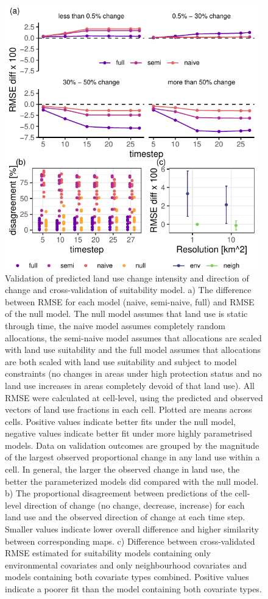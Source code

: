 \documentclass[titlesmallcaps,copyrightpage]{uomthesis}\usepackage[]{graphicx}\usepackage[]{color}
\begin{document}
\begin{figure}[htb]
\centering
\includegraphics[width=4.33in]{chapters/figures/chapter3/fig3.pdf} 
\caption{Validation of predicted land use change intensity and direction of change and cross-validation of suitability model. a) The difference between RMSE for each model (naive, semi-naive, full) and RMSE of the null model. The null model assumes that land use is static through time, the naive model assumes completely random allocations, the semi-naive model assumes that allocations are scaled with land use suitability and the full model assumes that allocations are both scaled with land use suitability and subject to model constraints (no changes in areas under high protection status and no land use increases in areas completely devoid of that land use). All RMSE were calculated at cell-level, using the predicted and observed vectors of land use fractions in each cell. Plotted are means across cells. Positive values indicate better fits under the null model, negative values indicate better fit under more highly parametrised models. Data on validation outcomes are grouped by the magnitude of the largest observed proportional change in any land use within a cell. In general, the larger the observed change in land use, the better the parameterized models did compared with the null model. b) The proportional disagreement between predictions of the cell-level direction of change (no change, decrease, increase) for each land use and the observed direction of change at each time step. Smaller values indicate lower overall difference and higher similarity between corresponding maps. c) Difference between cross-validated RMSE estimated for suitability models containing only environmental covariates and only neighbourhood covariates and models containing both covariate types combined. Positive values indicate a poorer fit than the model containing both covariate types.}
\label{ch3:fig3}
\end{figure}
\end{document}
